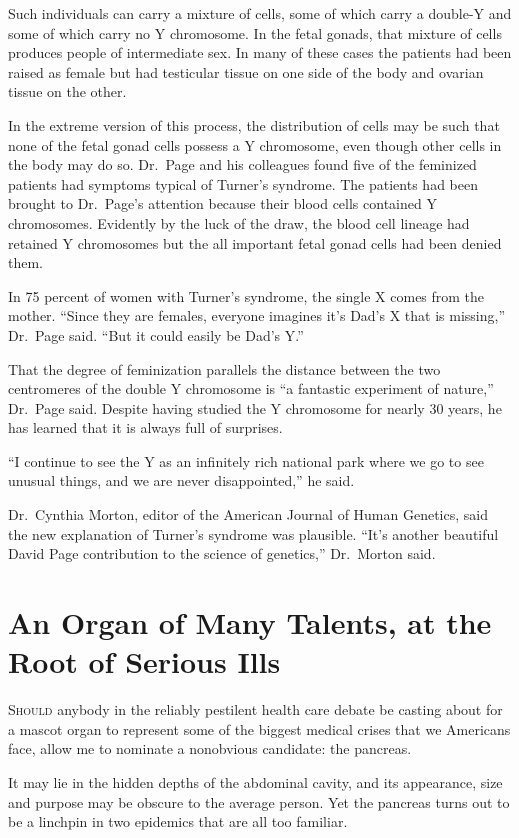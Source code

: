 ﻿\documentclass[12pt]{article}
\begin{document}
Such individuals can carry a mixture of cells, some of which carry a double-Y and some of which
carry no Y chromosome. In the fetal gonads, that mixture of cells produces people of intermediate
sex. In many of these cases the patients had been raised as female but had testicular tissue on one
side of the body and ovarian tissue on the other.

In the extreme version of this process, the distribution of cells may be such that none of the fetal
gonad cells possess a Y chromosome, even though other cells in the body may do so. Dr.~Page and his
colleagues found five of the feminized patients had symptoms typical of Turner's syndrome. The
patients had been brought to Dr.~Page's attention because their blood cells contained Y chromosomes.
Evidently by the luck of the draw, the blood cell lineage had retained Y chromosomes but the all
important fetal gonad cells had been denied them.

In 75 percent of women with Turner's syndrome, the single X comes from the mother. ``Since they are
females, everyone imagines it's Dad's X that is missing,'' Dr.~Page said. ``But it could easily be
Dad's Y.''

That the degree of feminization parallels the distance between the two centromeres of the double Y
chromosome is ``a fantastic experiment of nature,'' Dr.~Page said. Despite having studied the Y
chromosome for nearly 30 years, he has learned that it is always full of surprises.

``I continue to see the Y as an infinitely rich national park where we go to see unusual things, and
we are never disappointed,'' he said.

Dr.~Cynthia Morton, editor of the American Journal of Human Genetics, said the new explanation of
Turner's syndrome was plausible. ``It's another beautiful David Page contribution to the science of
genetics,'' Dr.~Morton said.

\section{An Organ of Many Talents, at the Root of Serious Ills}

\lettrine{S}{hould} anybody in the reliably pestilent\cite{pestilent} health care debate be casting
about for a mascot\cite{mascot} organ to represent some of the biggest medical crises that we
Americans face, allow me to nominate a nonobvious candidate: the pancreas\cite{pancreas}.

It may lie in the hidden depths of the abdominal cavity, and its appearance, size and purpose may be
obscure\cite{obscure} to the average person. Yet the pancreas turns out to be a linchpin in two
epidemics that are all too familiar.
\end{document}
